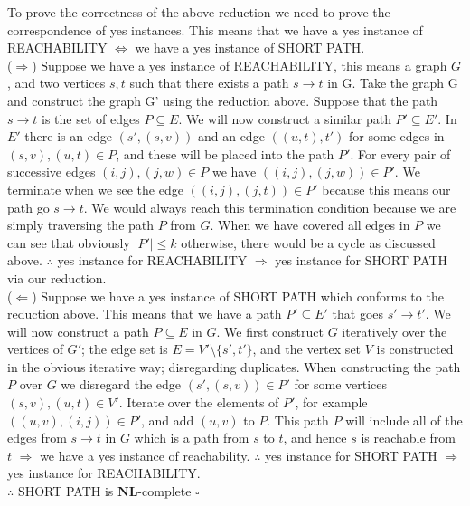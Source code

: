 \documentclass[12pt]{article}
\begin{document}
\begin{enumerate}
\begin{enumerate}
To prove the correctness of the above reduction we need to prove the correspondence of yes instances. This means that we have a yes instance of REACHABILITY $\iff$ we have a yes instance of SHORT PATH. \\
($\Rightarrow$) Suppose we have a yes instance of REACHABILITY, this means a graph $G$, and two vertices $s,t$ such that there exists a path $s\rightarrow t$ in G. Take the graph G and construct the graph G' using the reduction above. Suppose that the path $s\rightarrow t$ is the set of edges $P \subseteq E$. We will now construct a similar path $P' \subseteq E'$. In $E'$ there is an edge $(s',(s,v))$ and an edge $((u,t),t')$ for some edges in $(s,v),(u,t)\in P$, and these will be placed into the path $P'$. For every pair of successive edges $(i,j),(j,w)\in P$ we have $((i,j),(j,w))\in P'$. We terminate when we see the edge $((i,j),(j,t))\in P'$ because this means our path go $s\rightarrow t$. We would always reach this termination condition because we are simply traversing the path $P$ from $G$. When we have covered all edges in $P$ we can see that obviously $|P'|\leq k$ otherwise, there would be a cycle as discussed above. $\therefore $ yes instance for REACHABILITY $\Rightarrow $ yes instance for SHORT PATH via our reduction.
\\
($\Leftarrow$) Suppose we have a yes instance of SHORT PATH which conforms to the reduction above. This means that we have a path $P'\subseteq E'$ that goes $s'\rightarrow t'$. We will now construct a path $P\subseteq E$ in $G$. We first construct $G$ iteratively over the vertices of $G'$; the edge set is $E=V'\setminus \{s',t'\}$, and the vertex set $V$ is constructed in the obvious iterative way; disregarding duplicates. When constructing the path $P$ over $G$ we disregard the edge $(s',(s,v))\in P'$ for some vertices $(s,v),(u,t)\in V'$. Iterate over the elements of $P'$, for example $((u,v),(i,j))\in P'$, and add $(u,v)$ to $P$. This path $P$ will include all of the edges from $s\rightarrow t$ in $G$ which is a path from $s$ to $t$, and hence $s$ is reachable from $t$ $\Rightarrow $ we have a yes instance of reachability. $\therefore $ yes instance for SHORT PATH $\Rightarrow $ yes instance for REACHABILITY. \\
$\therefore $ SHORT PATH is $\textbf{NL}$-complete $\square$


\end{enumerate}
\end{enumerate}
\end{document}
